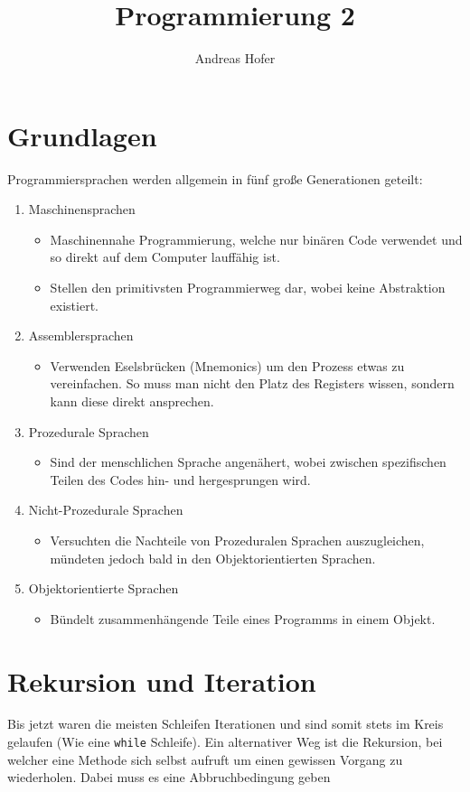 \documentclass{article}
\title{\vspace{-1cm}Programmierung 2}
\author{Andreas Hofer}
\begin{document}
	\maketitle
	\tableofcontents
	\section{Grundlagen}
	Programmiersprachen werden allgemein in fünf große Generationen geteilt:
	\begin{enumerate}
		\item{Maschinensprachen}
		\begin{itemize}
			\item{Maschinennahe Programmierung, welche nur binären Code verwendet und so direkt auf dem Computer lauffähig ist.}
			\item{Stellen den primitivsten Programmierweg dar, wobei keine Abstraktion existiert.}
		\end{itemize}
		\item{Assemblersprachen}
		\begin{itemize}
			\item{Verwenden Eselsbrücken (Mnemonics) um den Prozess etwas zu vereinfachen. So muss man nicht den Platz des Registers wissen, sondern kann diese direkt ansprechen.}
		\end{itemize}
		\item{Prozedurale Sprachen}
		\begin{itemize}
			\item{Sind der menschlichen Sprache angenähert, wobei zwischen spezifischen Teilen des Codes hin- und hergesprungen wird.}
		\end{itemize}
		\item{Nicht-Prozedurale Sprachen}
		\begin{itemize}
			\item{Versuchten die Nachteile von Prozeduralen Sprachen auszugleichen, mündeten jedoch bald in den Objektorientierten Sprachen.}
		\end{itemize}
		\item{Objektorientierte Sprachen}
		\begin{itemize}
			\item{Bündelt zusammenhängende Teile eines Programms in einem Objekt.}
		\end{itemize}
	\end{enumerate}
	\section{Rekursion und Iteration}
	Bis jetzt waren die meisten Schleifen Iterationen und sind somit stets im Kreis gelaufen (Wie eine \texttt{while} Schleife). Ein alternativer Weg ist die Rekursion, bei welcher eine Methode sich selbst aufruft um einen gewissen Vorgang zu wiederholen. Dabei muss es eine Abbruchbedingung geben
\end{document}
